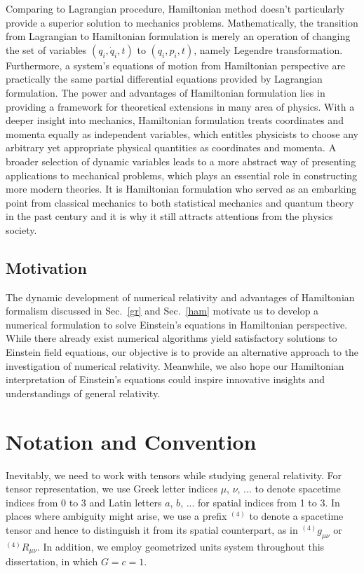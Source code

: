 Comparing to Lagrangian procedure, Hamiltonian method doesn't particularly provide a superior solution to mechanics problems. Mathematically, the transition from Lagrangian to Hamiltonian formulation is merely an operation of changing the set of variables $(q_{i}, {\dot q}_{i}, t)$ to $(q_{i}, p_{i}, t)$, namely Legendre transformation. Furthermore, a system's equations of motion from Hamiltonian perspective are practically the same partial differential equations provided by Lagrangian formulation. The power and advantages of Hamiltonian formulation lies in providing a framework for theoretical extensions in many area of physics. With a deeper insight into mechanics, Hamiltonian formulation treats coordinates and momenta equally as independent variables, which entitles physicists to choose any arbitrary yet appropriate physical quantities as coordinates and momenta. A broader selection of dynamic variables leads to a more abstract way of presenting applications to mechanical problems, which plays an essential role in constructing more modern theories. It is Hamiltonian formulation who served as an embarking point from classical mechanics to both statistical mechanics and quantum theory in the past century and it is why it still attracts attentions from the physics society\cite{goldstein}. 
\subsection{Motivation}
The dynamic development of numerical relativity and advantages of Hamiltonian formalism discussed in Sec.~\ref{gr} and Sec.~\ref{ham} motivate us to develop a numerical formulation to solve Einstein's equations in Hamiltonian perspective. While there already exist numerical algorithms yield satisfactory solutions to Einstein field equations, our objective is to provide an alternative approach to the investigation of numerical relativity. Meanwhile, we also hope our Hamiltonian interpretation of Einstein's equations could inspire innovative insights and understandings of general relativity. 
\section{Notation and Convention}\label{notation}
Inevitably, we need to work with tensors while studying general relativity. For tensor representation, we use Greek letter indices $\mu$, $\nu$, ... to denote spacetime indices from 0 to 3 and Latin letters $a$, $b$, ... for spatial indices from 1 to 3. In places where ambiguity might arise, we use a prefix $^{(4)}$ to denote a spacetime tensor and hence to distinguish it from its spatial counterpart, as in $^{(4)}g_{\mu\nu}$ or $^{(4)}R_{\mu\nu}$. In addition, we employ geometrized  units system throughout this dissertation, in which $G = c = 1$.

